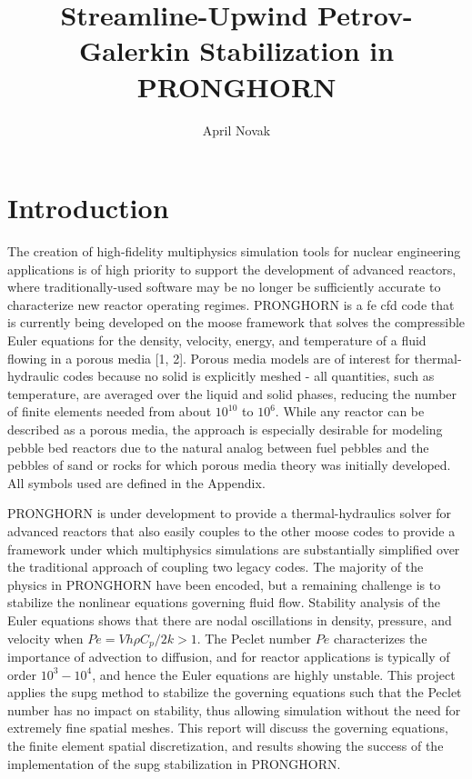 \documentclass[10pt]{article}
\numberwithin{equation}{section} %
\begin{document}
\title{Streamline-Upwind Petrov-Galerkin Stabilization in PRONGHORN}
\author{April Novak}
\maketitle

\clearpage
\section{Introduction}

The creation of high-fidelity multiphysics simulation tools for nuclear engineering applications is of high priority to support the development of advanced reactors, where traditionally-used software may be no longer be sufficiently accurate to characterize new reactor operating regimes. PRONGHORN is a \gls{fe} \gls{cfd} code that is currently being developed on the \gls{moose} framework that solves the compressible Euler equations for the density, velocity, energy, and temperature of a fluid flowing in a porous media [1, 2]. Porous media models are of interest for thermal-hydraulic codes because no solid is explicitly meshed - all quantities, such as temperature, are averaged over the liquid and solid phases, reducing the number of finite elements needed from about \(10^{10}\) to \(10^6\). While any reactor can be described as a porous media, the approach is especially desirable for modeling pebble bed reactors due to the natural analog between fuel pebbles and the pebbles of sand or rocks for which porous media theory was initially developed. All symbols used are defined in the Appendix.\newline

PRONGHORN is under development to provide a thermal-hydraulics solver for advanced reactors that also easily couples to the other
\gls{moose} codes to provide a framework under which multiphysics simulations are substantially simplified over the traditional approach of coupling two legacy codes. The majority of the physics in PRONGHORN have been encoded, but a remaining challenge is to stabilize the nonlinear equations governing fluid flow. Stability analysis of the Euler equations shows that there are nodal oscillations in density, pressure, and velocity when \(Pe=Vh\rho C_p/2k>1\). The Peclet number \(Pe\) characterizes the importance of advection to diffusion, and for reactor applications is typically of order \(10^3-10^4\), and hence the Euler equations are highly unstable. This project applies the \gls{supg} method to stabilize the governing equations such that the Peclet number has no impact on stability, thus allowing simulation without the need for extremely fine spatial meshes. This report will discuss the governing equations, the finite element spatial discretization, and results showing the success of the implementation of the \gls{supg} stabilization in PRONGHORN. 
\end{document}
